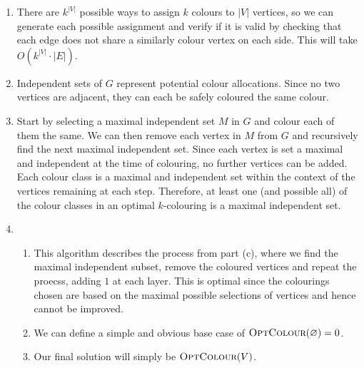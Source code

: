 \documentclass{article}
\begin{document}
\begin{solution}
\begin{enumerate}[label = (\alph*)]
    \item There are $k^{|V|}$ possible ways to assign $k$ colours to $|V|$ vertices, so we can generate each possible assignment and verify if it is valid by checking that each edge does not share a similarly colour vertex on each side. This will take $O(k^{|V|} \cdot |E|)$.

    \item Independent sets of $G$ represent potential colour allocations. Since no two vertices are adjacent, they can each be safely coloured the same colour. 

    \item Start by selecting a maximal independent set $M$ in $G$ and colour each of them the same. We can then remove each vertex in $M$ from $G$ and recursively find the next maximal independent set. Since each vertex is set a maximal and independent at the time of colouring, no further vertices can be added. Each colour class is a maximal and independent set within the context of the vertices remaining at each step. Therefore, at least one (and possible all) of the colour classes in an optimal $k$-colouring is a maximal independent set.

    \item
    \begin{enumerate}[label = (\roman*)]
        \item This algorithm describes the process from part (c), where we find the maximal independent subset, remove the coloured vertices and repeat the proecss, adding $1$ at each layer. This is optimal since the colourings chosen are based on the maximal possible selections of vertices and hence cannot be improved.

        \item We can define a simple and obvious base case of $\mathsf{\textsc{OptColour}}(\varnothing) = 0$.

        \item Our final solution will simply be $\mathsf{\textsc{OptColour}}(V)$.


\end{enumerate}
\end{enumerate}
\end{solution}
\end{document}
